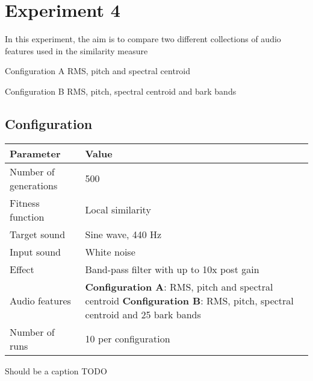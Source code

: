 \section{Experiment 4}
In this experiment, the aim is to compare two different collections of audio features used in the similarity measure

Configuration A RMS, pitch and spectral centroid

Configuration B RMS, pitch, spectral centroid and bark bands

\subsection{Configuration}
\begin{minipage}{\linewidth}
\centering
{} \label{tab:exp4_configuration} 
\begin{tabular}{ C{2.5in} C{2.6in} }\toprule[1.5pt]
\bf Parameter & \bf Value \\
\midrule
  Number of generations & 500 \\
\midrule
  Fitness function & Local similarity \\
\midrule
  Target sound & Sine wave, 440 Hz \\
\midrule
  Input sound & White noise \\
\midrule
  Effect & Band-pass filter with up to 10x post gain \\
\midrule
  Audio features & \textbf{Configuration A}: RMS, pitch and spectral centroid \newline
  \textbf{Configuration B}: RMS, pitch, spectral centroid and 25 bark bands \\
\midrule
  Number of runs & 10 per configuration \\
\bottomrule[1.25pt]
\end {tabular}\par
\bigskip
Should be a caption TODO
\end{minipage}

